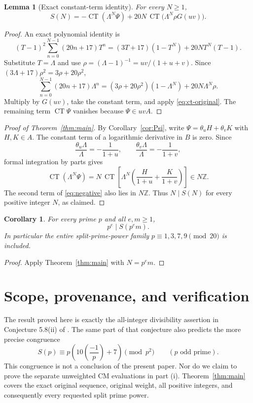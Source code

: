 \documentclass[11pt,a4paper]{article}
\newtheorem{lemma}[theorem]{Lemma}
\newtheorem{corollary}[theorem]{Corollary}
\theoremstyle{remark}\newtheorem{remark}[theorem]{Remark}
\newcommand{\Z}{\mathbb Z}\newcommand{\Q}{\mathbb Q}
\newcommand{\CT}{\operatorname{CT}}
\begin{document}
\begin{lemma}[Exact constant-term identity]\label{lem:negative}
For every \(N\ge1\),
\begin{equation}\label{eq:negative}
 S(N)=-\CT(\Lambda^N\Psi)
                   +20N\,\CT\bigl(\Lambda^N\rho G(uv)\bigr).
\end{equation}
\end{lemma}
\begin{proof}
An exact polynomial identity is
\[
 (T-1)^2\sum_{n=0}^{N-1}(20n+17)T^n
    =(3T+17)(1-T^N)+20NT^N(T-1).
\]
Substitute \(T=\Lambda\) and use
\(\rho=(\Lambda-1)^{-1}=uv/(1+u+v)\). Since
\((3\Lambda+17)\rho^2=3\rho+20\rho^2\),
\[
 \sum_{n=0}^{N-1}(20n+17)\Lambda^n
    =(3\rho+20\rho^2)(1-\Lambda^N)+20N\Lambda^N\rho.
\]
Multiply by \(G(uv)\), take the constant term, and apply
\eqref{eq:ct-original}. The remaining term \(\CT\Psi\) vanishes
because \(\Psi\in uvA\).
\end{proof}

\begin{proof}[Proof of Theorem~\ref{thm:main}]
By Corollary~\ref{cor:Psi}, write
\(\Psi=\theta_uH+\theta_vK\) with \(H,K\in A\).
The constant term of a logarithmic derivative in \(B\) is zero.
Since
\[
 \frac{\theta_u\Lambda}{\Lambda}=-\frac1{1+u},\qquad
 \frac{\theta_v\Lambda}{\Lambda}=-\frac1{1+v},
\]
formal integration by parts gives
\[
 \CT(\Lambda^N\Psi)
       =N\,\CT\left[\Lambda^N
               \left(\frac{H}{1+u}+\frac{K}{1+v}\right)\right]
       \in N\Z.
\]
The second term of \eqref{eq:negative} also lies in \(N\Z\).
Thus \(N\mid S(N)\) for every positive integer \(N\), as claimed.
\end{proof}

\begin{corollary}\label{cor:allcofactors}
For every prime \(p\) and all \(e,m\ge1\),
\[
                            p^e\mid S(p^em).
\]
In particular the entire split-prime-power family
\(p\equiv1,3,7,9\pmod{20}\) is included.
\end{corollary}
\begin{proof}
Apply Theorem~\ref{thm:main} with \(N=p^em\).
\end{proof}


\section{Scope, provenance, and verification}\label{sec:scope}

The result proved here is exactly the all-integer divisibility assertion
in Conjecture 5.8(ii) of \cite{Sun2010}. The same part of that conjecture
also predicts the more precise congruence
\[
 S(p)\equiv p\left(10\left(\frac{-1}{p}\right)+7\right)\pmod{p^2}
 \qquad(p\text{ odd prime}).
\]
This congruence is not a conclusion of the present paper. Nor do we
claim to prove the separate unweighted CM evaluations in part (i).
Theorem~\ref{thm:main} covers the exact original sequence, original
weight, all positive integers, and consequently every requested split
prime power.
\end{document}
